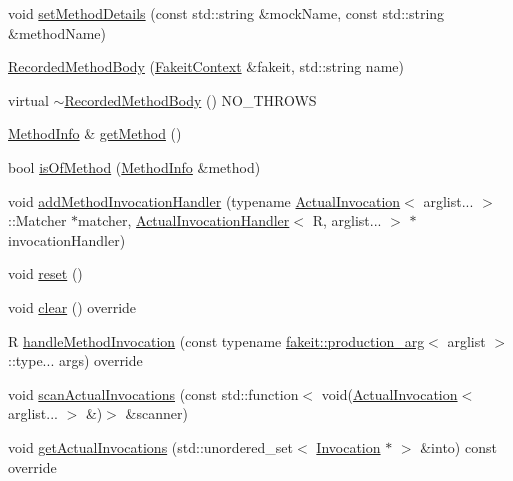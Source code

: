 \begin{DoxyCompactItemize}
\item 
void \mbox{\hyperlink{classfakeit_1_1RecordedMethodBody_abd4ca14120d7a8b302b06e05148b523c}{set\+Method\+Details}} (const std\+::string \&mock\+Name, const std\+::string \&method\+Name)
\item 
\mbox{\hyperlink{classfakeit_1_1RecordedMethodBody_af3668148275c0c7d1e22880218314eea}{Recorded\+Method\+Body}} (\mbox{\hyperlink{structfakeit_1_1FakeitContext}{Fakeit\+Context}} \&fakeit, std\+::string name)
\item 
virtual \mbox{\hyperlink{classfakeit_1_1RecordedMethodBody_a1afe57f937f8c6161774ae762f36b6d0}{$\sim$\+Recorded\+Method\+Body}} () N\+O\+\_\+\+T\+H\+R\+O\+WS
\item 
\mbox{\hyperlink{structfakeit_1_1MethodInfo}{Method\+Info}} \& \mbox{\hyperlink{classfakeit_1_1RecordedMethodBody_a12e45d3948ebf9e8b3e16f704fd16503}{get\+Method}} ()
\item 
bool \mbox{\hyperlink{classfakeit_1_1RecordedMethodBody_ac83a9eb22dedef9e10f3494198b5e3e1}{is\+Of\+Method}} (\mbox{\hyperlink{structfakeit_1_1MethodInfo}{Method\+Info}} \&method)
\item 
void \mbox{\hyperlink{classfakeit_1_1RecordedMethodBody_a41c27f1eafd04235bb736c2f60b636fa}{add\+Method\+Invocation\+Handler}} (typename \mbox{\hyperlink{structfakeit_1_1ActualInvocation}{Actual\+Invocation}}$<$ arglist... $>$\+::Matcher $\ast$matcher, \mbox{\hyperlink{structfakeit_1_1ActualInvocationHandler}{Actual\+Invocation\+Handler}}$<$ R, arglist... $>$ $\ast$invocation\+Handler)
\item 
void \mbox{\hyperlink{classfakeit_1_1RecordedMethodBody_a24512687527253aa107d707e053d1d2e}{reset}} ()
\item 
void \mbox{\hyperlink{classfakeit_1_1RecordedMethodBody_a6164a16c7813da2b7cd0d46568f1f1bc}{clear}} () override
\item 
R \mbox{\hyperlink{classfakeit_1_1RecordedMethodBody_a7ba17fdfe96f573c1d3992433a50d170}{handle\+Method\+Invocation}} (const typename \mbox{\hyperlink{structfakeit_1_1production__arg}{fakeit\+::production\+\_\+arg}}$<$ arglist $>$\+::type... args) override
\item 
void \mbox{\hyperlink{classfakeit_1_1RecordedMethodBody_a85b87e7396b4cc8536b384302826bae3}{scan\+Actual\+Invocations}} (const std\+::function$<$ void(\mbox{\hyperlink{structfakeit_1_1ActualInvocation}{Actual\+Invocation}}$<$ arglist... $>$ \&)$>$ \&scanner)
\item 
void \mbox{\hyperlink{classfakeit_1_1RecordedMethodBody_a72f16057f5f4b556f31237986116a094}{get\+Actual\+Invocations}} (std\+::unordered\+\_\+set$<$ \mbox{\hyperlink{structfakeit_1_1Invocation}{Invocation}} $\ast$ $>$ \&into) const override

\end{DoxyCompactItemize}
